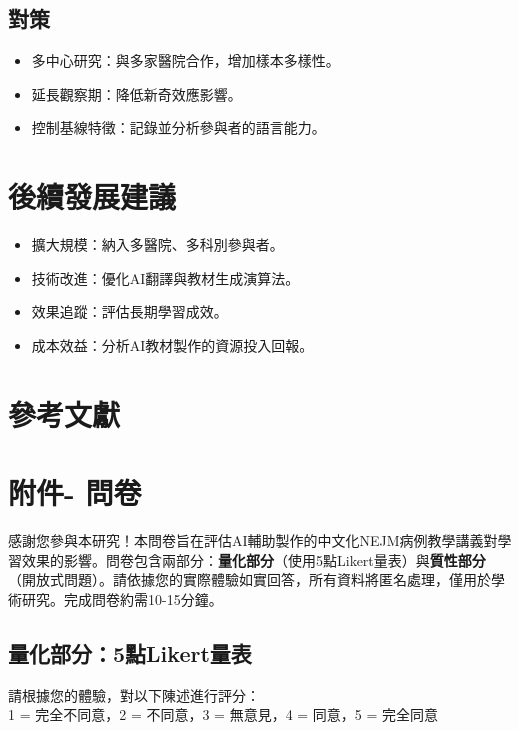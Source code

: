 \documentclass[12pt]{article}
\begin{document}
\subsection{對策}
\begin{itemize}
    \item 多中心研究：與多家醫院合作，增加樣本多樣性。
    \item 延長觀察期：降低新奇效應影響。
    \item 控制基線特徵：記錄並分析參與者的語言能力。
\end{itemize}

\section{後續發展建議}
\begin{itemize}
    \item 擴大規模：納入多醫院、多科別參與者。
    \item 技術改進：優化AI翻譯與教材生成演算法。
    \item 效果追蹤：評估長期學習成效。
    \item 成本效益：分析AI教材製作的資源投入回報。
\end{itemize}

\section{參考文獻}




\section{附件- 問卷}
感謝您參與本研究！本問卷旨在評估AI輔助製作的中文化NEJM病例教學講義對學習效果的影響。問卷包含兩部分：\textbf{量化部分}（使用5點Likert量表）與\textbf{質性部分}（開放式問題）。請依據您的實際體驗如實回答，所有資料將匿名處理，僅用於學術研究。完成問卷約需10-15分鐘。

\subsection*{量化部分：5點Likert量表}
請根據您的體驗，對以下陳述進行評分：\\
1 = 完全不同意，2 = 不同意，3 = 無意見，4 = 同意，5 = 完全同意
\end{document}
